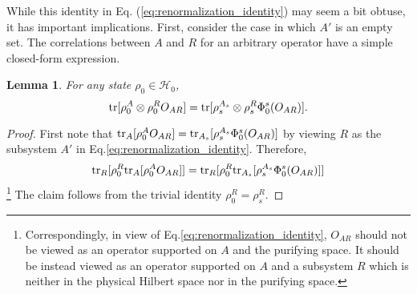 \documentclass[a4paper,11pt]{article}
\newcommand{\1}{\mathbbm{1}}
\newcommand{\cH}{\mathcal{H}}
\newcommand{\tr}{{\rm tr}}
\newtheorem{lem}{Lemma}
\begin{document}
While this identity in Eq. (\ref{eq:renormalization_identity}) may seem a bit obtuse, it has important implications. First, consider the case in which $A'$ is an empty set. The correlations between $A$ and $R$ for an arbitrary operator have a simple closed-form expression.
\begin{lem}\label{lem:clustering_identity_simple}
For any state $\rho_0\in\cH_0$,
\begin{equation}
\tr[\rho_0^{A} \otimes \rho_0^{R}O_{AR}] = \tr[\rho_s^{A_s}\otimes \rho_s^R\Phi_0^s(O_{AR})]. \label{eq:clustering_identity_simple}
\end{equation}
\end{lem}
\begin{proof}
First note that $\tr_A[\rho_0^A O_{AR}] = \tr_{A_s}[\rho_s^{A_s} \Phi_0^s(O_{AR})]$ by viewing $R$ as the subsystem $A'$ in Eq.\ref{eq:renormalization_identity}.
Therefore,
\begin{equation}
	\tr_R[\rho_0^R\tr_A[\rho_0^AO_{AR}]] = \tr_R[\rho_0^R\tr_{A_s}[\rho_s^{A_s}\Phi_0^s(O_{AR})]]
\end{equation}
\footnote{Correspondingly, in view of Eq.\ref{eq:renormalization_identity}, $O_{AR}$ should not be viewed as an operator supported on $A$ and the purifying space. It should be instead viewed as an operator supported on $A$ and a subsystem $R$ which is neither in the physical Hilbert space nor in the purifying space.} The claim follows from the trivial identity $\rho_0^R=\rho_s^R$.
\end{proof}
\end{document}

